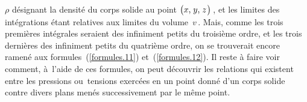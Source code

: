 \documentclass[11pt, twoside, leqno]{article}
\renewcommand{\eqref}[1]{(\ref{#1})}
\begin{document}
$\rho$\; désignant la densité du corps solide au point \hbox{\;$\bigl( x\text{,}\;y\text{,}\;z \hspace{.2ex}\bigr)$\,},\hspace{.5ex} et les limites des intégrations étant relatives aux limites du volume~\;$v$\,.\hspace{.6ex} Mais, comme les trois premières intégrales seraient des infiniment petits du troisième ordre, et les trois dernières des infiniment petits du quatrième ordre, on se trouverait encore ramené aux formules~\eqref{formules.11} et~\eqref{formules.12}. Il reste à faire voir comment, à~l'aide de ces formules, on peut découvrir les relations qui existent entre les pressions ou~tensions exercées en un point donné d'un corps solide contre divers plans menés successivement par le même point.
\end{document}
